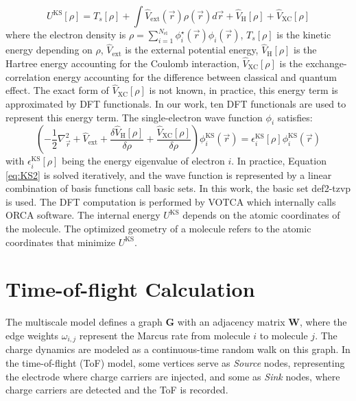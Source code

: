 \documentclass[letterpaper,12pt]{article}
\begin{document}
\begin{equation}
    U^\text{KS}[\rho] = T_s[\rho] + \int \hat{V}_\text{ext}(\vec{r}) \rho(\vec{r}) d \vec{r} + \hat{V}_\text{H}[\rho] + \hat{V}_\text{XC}[\rho]
    \label{eq:KS_model}
\end{equation}
where the electron density is $\rho=\sum\limits_{i=1}^{N_\text{el}} \phi_i^\star(\vec{r}) \phi_i(\vec{r})$, $T_s[\rho]$ is the kinetic energy depending on $\rho$,  $\hat{V}_\text{ext}$ is the external potential energy,  $\hat{V}_\text{H}[\rho]$ is the Hartree energy accounting for the Coulomb interaction, $\hat{V}_\text{XC}[\rho]$ is the exchange-correlation energy accounting for the difference between classical and quantum effect. The exact form of $\hat{V}_\text{XC}[\rho]$ is not known, in practice, this energy term is approximated by DFT functionals. In our work, ten DFT functionals are used to represent this energy term. 
The single-electron wave function $\phi_i$ satisfies: 
\begin{equation}
    (-\frac{1}{2}\nabla^2_{\vec{r}} + \hat{V}_\text{ext} + \frac{\delta \hat{V}_\text{H}[\rho]}{\delta \rho} + \frac{\hat{V}_\text{XC}[\rho]}{\delta \rho}) \phi_i^\text{KS}(\vec{r}) =  \epsilon^\text{KS}_i[\rho] \phi^\text{KS}_i (\vec{r}) 
    \label{eq:KS2}
\end{equation}
with $\epsilon^\text{KS}_i[\rho]$ being the energy eigenvalue of electron $i$. 
In practice, Equation \ref{eq:KS2} is solved iteratively, and the wave function is represented by a linear combination of basis functions call basic sets. 
In this work, the basic set def2-tzvp \cite{weigend_accurate_2006} is used. The DFT computation is performed by VOTCA \cite{Baumeier2011} which internally calls ORCA software.
The internal energy $U^\text{KS}$ depends on the atomic coordinates of the molecule. The optimized geometry of a molecule refers to the atomic coordinates that minimize $U^\text{KS}$.

\section{Time-of-flight Calculation}
The multiscale model defines a graph $\mathbf{G}$ with an adjacency matrix $\mathbf{W}$, where the edge weights $\omega_{i,j}$ represent the Marcus rate from molecule $i$ to molecule $j$. The charge dynamics are modeled as a continuous-time random walk on this graph. In the time-of-flight (ToF) model, some vertices serve as \textit{Source} nodes, representing the electrode where charge carriers are injected, and some as \textit{Sink} nodes, where charge carriers are detected and the ToF is recorded.
\end{document}
